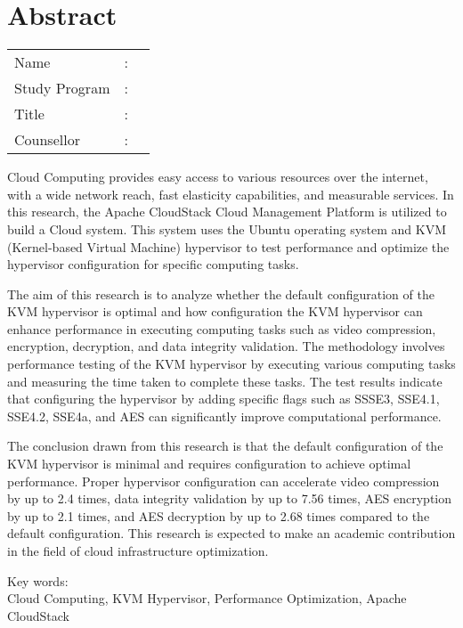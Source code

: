 %
%
%

\chapter*{Abstract}

\vspace*{0.2cm}
{
	\setlength{\parindent}{0pt}

	\begin{tabular}{@{}l l p{10cm}}
		Name          & : & \penulis      \\
		Study Program & : & \program      \\
		Title         & : & \judulInggris \\
		Counsellor    & : & \pembimbing   \\
	\end{tabular}

	\bigskip
	\bigskip

	Cloud Computing provides easy access to various resources over the internet, with a wide network reach, fast elasticity capabilities, and measurable services. In this research, the Apache CloudStack Cloud Management Platform is utilized to build a Cloud system. This system uses the Ubuntu operating system and KVM (Kernel-based Virtual Machine) hypervisor to test performance and optimize the hypervisor configuration for specific computing tasks.

	The aim of this research is to analyze whether the default configuration of the KVM hypervisor is optimal and how configuration the KVM hypervisor can enhance performance in executing computing tasks such as video compression, encryption, decryption, and data integrity validation. The methodology involves performance testing of the KVM hypervisor by executing various computing tasks and measuring the time taken to complete these tasks. The test results indicate that configuring the hypervisor by adding specific flags such as SSSE3, SSE4.1, SSE4.2, SSE4a, and AES can significantly improve computational performance.

	The conclusion drawn from this research is that the default configuration of the KVM hypervisor is minimal and requires configuration to achieve optimal performance. Proper hypervisor configuration can accelerate video compression by up to 2.4 times, data integrity validation by up to 7.56 times, AES encryption by up to 2.1 times, and AES decryption by up to 2.68 times compared to the default configuration. This research is expected to make an academic contribution in the field of cloud infrastructure optimization.

	\bigskip

	Key words:\\
	Cloud Computing, KVM Hypervisor, Performance Optimization, Apache CloudStack
}

\newpage